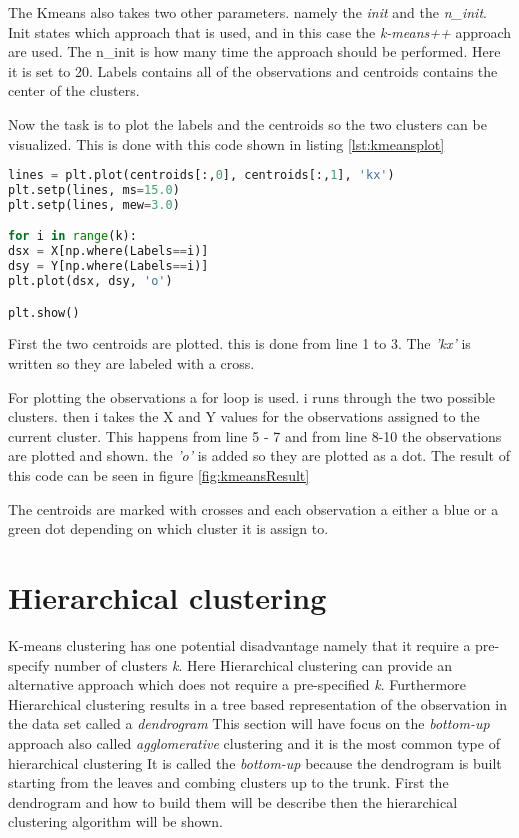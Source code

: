 The Kmeans also takes two other parameters. namely the \emph{init} and the \emph{n\_init}. Init states which approach that is used, and in this case the \emph{k-means++} approach are used. The n\_init is how many time the approach should be performed. Here it is set to 20.
Labels contains all of the observations and centroids contains the center of the clusters.

Now the task is to plot the labels and the centroids so the two clusters can be visualized. 
This is done with this code shown in listing \ref{lst:kmeansplot}

\begin{lstlisting}[language=Python, label=lst:kmeansplot, caption=The code for plotting the two clusters]
lines = plt.plot(centroids[:,0], centroids[:,1], 'kx')
plt.setp(lines, ms=15.0)
plt.setp(lines, mew=3.0)

for i in range(k):
dsx = X[np.where(Labels==i)]
dsy = Y[np.where(Labels==i)]
plt.plot(dsx, dsy, 'o')

plt.show()
\end{lstlisting}

First the two centroids are plotted. this is done from line 1 to 3. The \emph{'kx'} is written so they are labeled with a cross.

For plotting the observations a for loop is used. i runs through the two possible clusters. then i takes the X and Y values for the observations assigned to the current cluster. This happens from line 5 - 7 and from line 8-10 the observations are plotted and shown. the \emph{'o'} is added so they are plotted as a dot. 
The result of this code can be seen in figure \ref{fig:kmeansResult}


The centroids are marked with crosses and each observation a either a blue or a green dot depending on which cluster it is assign to.


\section{Hierarchical clustering}
K-means clustering has one potential disadvantage namely that it require a pre-specify number of clusters \emph{k}. Here Hierarchical clustering can provide an alternative approach which does not require a pre-specified \emph{k}.
Furthermore Hierarchical clustering results in a tree based representation of the observation in the data set called a \emph{dendrogram}
This section will have focus on the \emph{bottom-up} approach also called \emph{agglomerative} clustering and it is the most common type of hierarchical clustering It is called the \emph{bottom-up} because the dendrogram is built starting from the leaves and combing clusters up to the trunk. 
First the dendrogram and how to build them will be describe then the hierarchical clustering algorithm will be shown.

